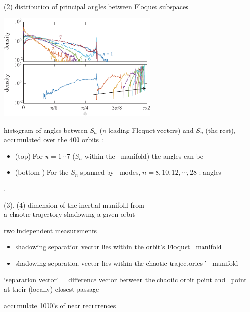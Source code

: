 \begin{frame}{(2) distribution of principal angles between Floquet subspaces}
\begin{center}
\includegraphics[width=0.6\textwidth]{../../dimension/ks22vecAngles}
\end{center}


histogram of angles between $S_n$
($n$ leading Floquet vectors) and $\bar{S}_n$
(the rest),
accumulated over the 400 orbits :
\begin{itemize}
  \item
(top) For
$n=1 \cdots 7$ ($S_n$ within the \entangled\ manifold) the angles can be
{\color{red}{arbitrarily small}}
  \item
(bottom ) For the $\bar{S}_n$ spanned by \transient\
modes,
$n=8,10,12,\cdots,28$ :
angles {\color{red}{bounded away from unity}}
\end{itemize}
.
\end{frame}

\begin{frame}{(3), (4) dimension of the inertial manifold from \\
        a chaotic trajectory shadowing a given orbit}

\bigskip

two independent measurements

\begin{itemize}
  \item[(3)] shadowing separation vector lies within the orbit's Floquet \entangled\ manifold
  \item[(4)]  shadowing separation vector lies within the chaotic trajectories \cLvs' \entangled\ manifold
\end{itemize}

\bigskip

`separation vector' = difference vector between the chaotic orbit point and
\po\ point at their (locally) closest passage

\medskip

accumulate 1000's of near recurrences


\end{frame}

